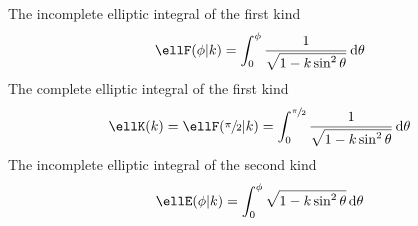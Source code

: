 The incomplete elliptic integral of the first kind
\begin{equation}\label{eq:incomplete_elliptic_integral_first}
  \ellF(\phi \vert k) = \int_{0}^{\phi} \frac{1}{\sqrt{1 - k \sin^2{\theta}}}\,\dee\theta
\end{equation}
The complete elliptic integral of the first kind
\begin{equation}\label{eq:complete_elliptic_integral_first}
  \ellK(k) = \ellF(\sfrac{\pi}{2} \vert k) = \int_{0}^{\sfrac{\pi}{2}} \frac{1}{\sqrt{1 - k\sin^2{\theta}}} \,\dee\theta
\end{equation}
The incomplete elliptic integral of the second kind
\begin{equation}\label{eq:incomplete_elliptic_integral_second}
  \ellE(\phi \vert k) = \int_{0}^{\phi} \sqrt{1 - k \sin^2{\theta}}\,\dee\theta
\end{equation}

